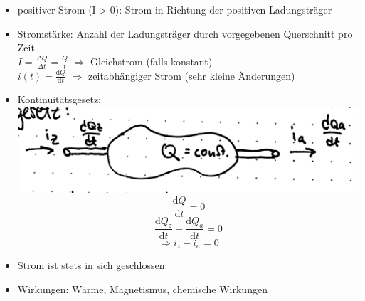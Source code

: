 \documentclass[10pt, a4paper]{article}
\newcommand{\Ra}{$\Rightarrow$ }
\newcommand{\delt}{\mathrm{d}}
\begin{document}
\begin{itemize}
	\item positiver Strom (I > 0): Strom in Richtung der positiven Ladungsträger
	\item Stromstärke: Anzahl der Ladungsträger durch vorgegebenen Querschnitt pro Zeit\\
		$I = \frac{\Delta Q}{\Delta t} = \frac{Q}{t}$ \Ra Gleichstrom (falls konstant)\\
		$i(t) = \frac{\mathrm{d}Q}{\mathrm{d}t}$ \Ra zeitabhängiger Strom (sehr kleine Änderungen)
	\item Kontinuitätsgesetz:\\
		\includegraphics[width=\textwidth]{img/6}
		$$\frac{\mathrm{d}Q}{\mathrm{d}t}=0$$
		$$\frac{\delt Q_z}{\delt t} - \frac{\delt Q_a}{\delt t} = 0$$
		$$\Rightarrow i_z - i_a = 0$$
	\item Strom ist stets in sich geschlossen
	\item Wirkungen: Wärme, Magnetismus, chemische Wirkungen
\end{itemize}
\end{document}
